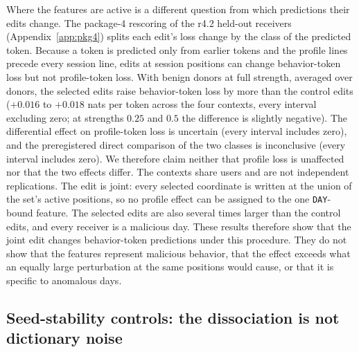 \documentclass[10pt]{article} %
\newcommand{\rfour}{r4.2}
\begin{document}
Where the features are active is a different question from which
predictions their edits change. The package-4 rescoring of the \rfour{}
held-out receivers (Appendix~\ref{app:pkg4}) splits each edit's loss change by
the class of the predicted token. Because a token is predicted only from
earlier tokens and the profile lines precede every session line, edits at
session positions can change behavior-token loss but not profile-token loss.
With benign donors at full strength, averaged over donors, the selected edits
raise behavior-token loss by more than the control edits ($+0.016$ to
$+0.018$ nats per token across the four contexts, every interval excluding
zero; at strengths $0.25$ and $0.5$ the difference is slightly negative). The
differential effect on profile-token loss is uncertain (every interval
includes zero), and the preregistered direct comparison of the two classes is
inconclusive (every interval includes zero). We therefore claim neither that
profile loss is unaffected nor that the two effects differ. The contexts share
users and are not independent replications. The edit is joint: every selected
coordinate is written at the union of the set's active positions, so no
profile effect can be assigned to the one \texttt{DAY}-bound feature. The
selected edits are also several times larger than the control edits, and
every receiver is a malicious day. These results therefore show that the joint
edit changes behavior-token predictions under this procedure. They do not
show that the features represent malicious behavior, that the effect exceeds
what an equally large perturbation at the same positions would cause, or that
it is specific to anomalous days.



\subsection{Seed-stability controls: the dissociation is not dictionary noise}
\label{sec:seeds}
\end{document}
